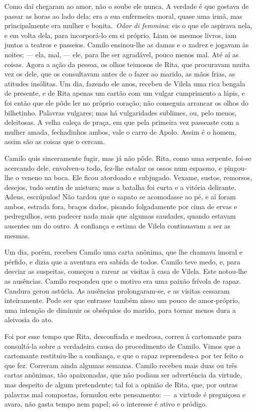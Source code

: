 Como daí chegaram ao amor, não o soube ele nunca. A verdade é que
gostava de passar as horas ao lado dela; era a sua enfermeira moral,
quase uma irmã, mas principalmente era mulher e bonita.~\emph{Odor di
femmina}: eis o que ele aspirava nela, e em volta dela, para
incorporá-lo em si próprio. Liam os mesmos livros, iam juntos a teatros
e passeios. Camilo ensinou-lhe as damas e o xadrez e jogavam às noites;
--- ela, mal, --- ele, para lhe ser agradável, pouco menos mal. Até aí
as coisas. Agora a ação da pessoa, os olhos teimosos de Rita, que
procuravam muita vez os dele, que os consultavam antes de o fazer ao
marido, as mãos frias, as atitudes insólitas. Um dia, fazendo ele anos,
recebeu de Vilela uma rica bengala de presente, e de Rita apenas um
cartão com um vulgar cumprimento a lápis, e foi então que ele pôde ler
no próprio coração; não conseguia arrancar os olhos do bilhetinho.
Palavras vulgares; mas há vulgaridades sublimes, ou, pelo menos,
deleitosas. A velha caleça de praça, em que pela primeira vez passeaste
com a mulher amada, fechadinhos ambos, vale o carro de Apolo. Assim é o
homem, assim são as coisas que o cercam.

Camilo quis sinceramente fugir, mas já não pôde. Rita, como uma
serpente, foi-se acercando dele, envolveu-o todo, fez-lhe estalar os
ossos num espasmo, e pingou-lhe o veneno na boca. Ele ficou atordoado e
subjugado. Vexame, sustos, remorsos, desejos, tudo sentiu de mistura;
mas a batalha foi curta e a vitória delirante. Adeus, escrúpulos! Não
tardou que o sapato se acomodasse ao pé, e aí foram ambos, estrada fora,
braços dados, pisando folgadamente por cima de ervas e pedregulhos, sem
padecer nada mais que algumas saudades, quando estavam ausentes um do
outro. A confiança e estima de Vilela continuavam a ser as mesmas.

Um dia, porém, recebeu Camilo uma carta anônima, que lhe chamava imoral
e pérfido, e dizia que a aventura era sabida de todos. Camilo teve medo,
e, para desviar as suspeitas, começou a rarear as visitas à casa de
Vilela. Este notou-lhe as ausências. Camilo respondeu que o motivo era
uma paixão frívola de rapaz. Candura gerou astúcia. As ausências
prolongaram-se, e as visitas cessaram inteiramente. Pode ser que
entrasse também nisso um pouco de amor-próprio, uma intenção de diminuir
os obséquios do marido, para tornar menos dura a aleivosia do ato.

Foi por esse tempo que Rita, desconfiada e medrosa, correu à cartomante
para consultá-la sobre a verdadeira causa do procedimento de Camilo.
Vimos que a cartomante restituiu-lhe a confiança, e que o rapaz
repreendeu-a por ter feito o que fez. Correram ainda algumas semanas.
Camilo recebeu mais duas ou três cartas anônimas, tão apaixonadas, que
não podiam ser advertência da virtude, mas despeito de algum
pretendente; tal foi a opinião de Rita, que, por outras palavras mal
compostas, formulou este pensamento: ---~a virtude é preguiçosa e avara,
não gasta tempo nem papel; só o interesse é ativo e pródigo.

